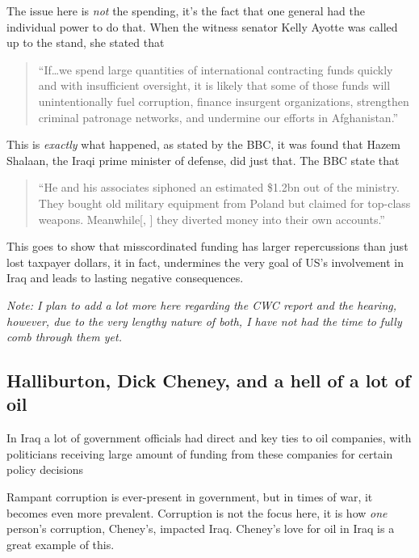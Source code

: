 \documentclass{article}
\begin{document}
        The issue here is \textit{not} the spending, it's the fact that one general had the individual power to do that. 
        When the witness senator Kelly Ayotte was called up to the stand, she stated that 

        \begin{quote}
            ``If\ldots we spend large quantities of international contracting funds quickly and with insufficient oversight, it is likely  that some of those funds will unintentionally fuel corruption, finance insurgent organizations, strengthen criminal patronage networks, and undermine our efforts in Afghanistan.'' \parencite{us_senate2011wartime_contracting}
        \end{quote}

        This is \textit{exactly} what happened, as stated by the BBC, it was found that Hazem Shalaan, the Iraqi prime minister of defense, did just that. The BBC state that

        \begin{quote}
            ``He and his associates siphoned an estimated \$1.2bn out of the ministry. They bought old military equipment from Poland but claimed for top-class weapons. Meanwhile[, ] they diverted money into their own accounts.''
        \end{quote}

        This goes to show that misscordinated funding has larger repercussions than just lost taxpayer dollars, it in fact, undermines the very goal of US's involvement in Iraq and leads to lasting negative consequences. 

        \textit{Note: I plan to add a lot more here regarding the CWC report and the hearing, however, due to the very lengthy nature of both, I have not had the time to fully comb through them yet. }

    \subsection{Halliburton, Dick Cheney, and a hell of a lot of oil}
        In Iraq a lot of government officials had direct and key ties to oil companies, with politicians receiving large amount of funding from these companies for certain policy decisions

        Rampant corruption is ever-present in government, but in times of war, it becomes even more prevalent. Corruption is not the focus here, it is how \textit{one} person's corruption, Cheney's, impacted Iraq. Cheney's love for oil in Iraq is a great example of this.
\end{document}
